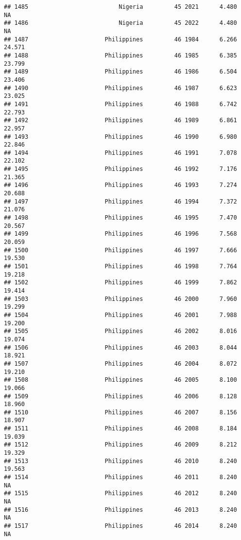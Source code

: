 \documentclass[
]{article}
\begin{document}
\begin{verbatim}
## 1485                          Nigeria         45 2021      4.480         NA
## 1486                          Nigeria         45 2022      4.480         NA
## 1487                      Philippines         46 1984      6.266     24.571
## 1488                      Philippines         46 1985      6.385     23.799
## 1489                      Philippines         46 1986      6.504     23.406
## 1490                      Philippines         46 1987      6.623     23.025
## 1491                      Philippines         46 1988      6.742     22.793
## 1492                      Philippines         46 1989      6.861     22.957
## 1493                      Philippines         46 1990      6.980     22.846
## 1494                      Philippines         46 1991      7.078     22.102
## 1495                      Philippines         46 1992      7.176     21.365
## 1496                      Philippines         46 1993      7.274     20.688
## 1497                      Philippines         46 1994      7.372     21.076
## 1498                      Philippines         46 1995      7.470     20.567
## 1499                      Philippines         46 1996      7.568     20.059
## 1500                      Philippines         46 1997      7.666     19.530
## 1501                      Philippines         46 1998      7.764     19.218
## 1502                      Philippines         46 1999      7.862     19.414
## 1503                      Philippines         46 2000      7.960     19.299
## 1504                      Philippines         46 2001      7.988     19.200
## 1505                      Philippines         46 2002      8.016     19.074
## 1506                      Philippines         46 2003      8.044     18.921
## 1507                      Philippines         46 2004      8.072     19.210
## 1508                      Philippines         46 2005      8.100     19.066
## 1509                      Philippines         46 2006      8.128     18.960
## 1510                      Philippines         46 2007      8.156     18.907
## 1511                      Philippines         46 2008      8.184     19.039
## 1512                      Philippines         46 2009      8.212     19.329
## 1513                      Philippines         46 2010      8.240     19.563
## 1514                      Philippines         46 2011      8.240         NA
## 1515                      Philippines         46 2012      8.240         NA
## 1516                      Philippines         46 2013      8.240         NA
## 1517                      Philippines         46 2014      8.240         NA

\end{verbatim}
\end{document}
